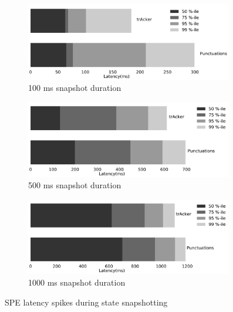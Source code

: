 
\begin{figure}[t!]
    \begin{subfigure}[b]{0.25\textwidth}
            \includegraphics[width=0.99\textwidth]{pics/buffering_latencies_barh_100.pdf}
            \caption{100 ms snapshot duration}
            \label{100ms_snapshot}
    \end{subfigure}
    \hspace{5mm}
    \begin{subfigure}[b]{0.25\textwidth}
            \includegraphics[width=0.99\textwidth]{pics/buffering_latencies_barh_500.pdf}
            \caption{500 ms snapshot duration}
            \label{500ms_snapshot}
    \end{subfigure}
    \hspace{5mm}
    \begin{subfigure}[b]{0.25\textwidth}
            \includegraphics[width=0.99\textwidth]{pics/buffering_latencies_barh_1000.pdf}
            \caption{1000 ms snapshot duration}
            \label{1000ms_snapshot}
    \end{subfigure}
    \caption{SPE latency spikes during state snapshotting}
    \label{snapshot_spikes}
\end{figure}

